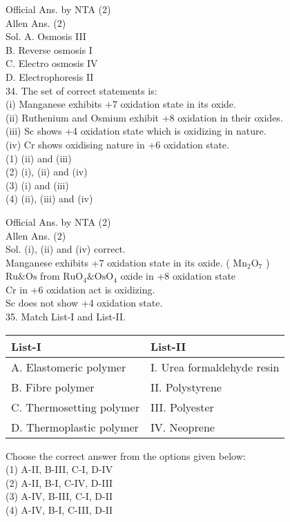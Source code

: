 \documentclass[10pt]{article}
\begin{document}
Official Ans. by NTA (2)\\
Allen Ans. (2)\\
Sol. A. Osmosis III\\
B. Reverse osmosis I\\
C. Electro osmosis IV\\
D. Electrophoresis II\\
34. The set of correct statements is:\\
(i) Manganese exhibits +7 oxidation state in its oxide.\\
(ii) Ruthenium and Osmium exhibit +8 oxidation in their oxides.\\
(iii) Sc shows +4 oxidation state which is oxidizing in nature.\\
(iv) Cr shows oxidising nature in +6 oxidation state.\\
(1) (ii) and (iii)\\
(2) (i), (ii) and (iv)\\
(3) (i) and (iii)\\
(4) (ii), (iii) and (iv)

Official Ans. by NTA (2)\\
Allen Ans. (2)\\
Sol. (i), (ii) and (iv) correct.\\
Manganese exhibits +7 oxidation state in its oxide. ( \(\mathrm{Mn}_{2} \mathrm{O}_{7}\) )\\
\(\mathrm{Ru} \& \mathrm{Os}\) from \(\mathrm{RuO}_{4} \& \mathrm{OsO}_{4}\) oxide in +8 oxidation state\\
Cr in +6 oxidation act is oxidizing.\\
Sc does not show +4 oxidation state.\\
35. Match List-I and List-II.

\begin{center}
\begin{tabular}{|l|l|}
\hline
List-I & List-II \\
\hline
A. Elastomeric polymer & I. Urea formaldehyde resin \\
\hline
B. Fibre polymer & II. Polystyrene \\
\hline
C. Thermosetting polymer & III. Polyester \\
\hline
D. Thermoplastic polymer & IV. Neoprene \\
\hline
\end{tabular}
\end{center}

Choose the correct answer from the options given below:\\
(1) A-II, B-III, C-I, D-IV\\
(2) A-II, B-I, C-IV, D-III\\
(3) A-IV, B-III, C-I, D-II\\
(4) A-IV, B-I, C-III, D-II
\end{document}

